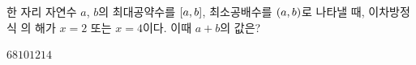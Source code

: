 한 자리 자연수 $a$, $b$의 최대공약수를 $[a{,}\mkern3mu b]$, 최소공배수를 $(a{,}\mkern3mu b)$로 나타낼 때, 이차방정식  의 해가 $x=2$ 또는 $x=4$이다. 이때 $a+b$의 값은?
\begin{choices32}{$6$}{$8$}{$10$}{$12$}{$14$}\end{choices32}

